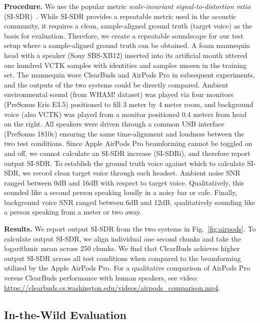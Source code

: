 \documentclass [11pt, proquest] {uwthesis}[2020/02/24]
\begin{document}
{\bf Procedure.} We use the popular metric \textit{scale-invariant signal-to-distortion ratio} (SI-SDR)~\cite{sdr}. While SI-SDR provides a repeatable metric used in the acoustic community, it requires a clean, sample-aligned ground truth (target voice) as the basis for evaluation. Therefore, we create a repeatable soundscape for our test setup where a sample-aligned ground truth can be obtained.
A foam mannequin head with a speaker (Sony SBS-XB12) inserted into its artificial mouth uttered one hundred VCTK samples with identities and samples unseen in the training set. The mannequin wore ClearBuds and AirPods Pro in subsequent experiments, and the outputs of the two systems could be directly compared.
Ambient environmental sound (from WHAM! dataset) was played via four monitors (PreSonus Eris E3.5) positioned to fill 3 meter by 4 meter room, and background voice (also VCTK) was played from a monitor positioned 0.4 meters from head on the right. 
All speakers were driven through a common USB interface (PreSonus 1810c) ensuring the same time-alignment and loudness between the two  test conditions.
Since Apple AirPods Pro beamforming cannot be toggled on and off, we cannot calculate an SI-SDR increase (SI-SDRi), and therefore report output SI-SDR.
To establish the ground truth voice against which to calculate SI-SDR, we record clean target voice through each headset.
Ambient noise SNR ranged between 0dB and 16dB with respect to target voice. Qualitatively, this sounded like a second person speaking loudly in a noisy bar or cafe. Finally, background voice SNR ranged between 6dB and 12dB, qualitatively sounding like a person speaking from a meter or two away.


{\bf Results.}  We report output SI-SDR from the two systems in Fig.~\ref{fig:airpods}. To calculate output SI-SDR, we align individual one second chunks and take the logarithmic mean across 250 chunks. We find that ClearBuds achieves  higher output SI-SDR across all test conditions when  compared to the beamforming utilized by the Apple AirPods Pro. For a qualitative comparison of AirPods Pro versus ClearBuds performance with human speakers, see video: \textcolor{blue}{{{\url{https://clearbuds.cs.washington.edu/videos/airpods_comparison.mp4}}}}. %

\subsection{In-the-Wild Evaluation}\label{sec:mos} 
\end{document}
